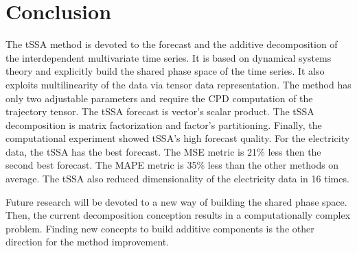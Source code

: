 \documentclass[referee, pdflatex, sn-mathphys-num]{sn-jnl}
\theoremstyle{definition}
\theoremstyle{plain}
\begin{document}
	\section{Conclusion}
	
		The tSSA method is devoted to the forecast and the additive decomposition of the interdependent multivariate time series. It is based on dynamical systems theory and explicitly build the shared phase space of the time series. It also exploits multilinearity of the data via tensor data representation. The method has only two adjustable parameters and require the CPD computation of the trajectory tensor. The tSSA forecast is vector's scalar product. The tSSA decomposition is matrix factorization and factor's partitioning. Finally, the computational experiment showed tSSA's high forecast quality. For the electricity data, the tSSA has the best forecast. The MSE metric is 21\% less then the second best forecast. The MAPE metric is 35\% less than the other methods on average. The tSSA also reduced dimensionality of the electricity data in 16 times.
		
		Future research will be devoted to a new way of building the shared phase space. Then, the current decomposition conception results in a computationally complex problem. Finding new concepts to build additive components is the other direction for the method improvement.
		
		
		
\end{document}
